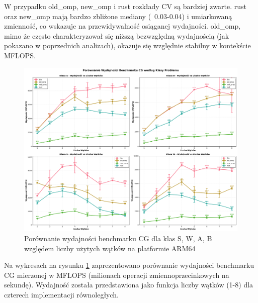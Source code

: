 W przypadku old\_omp, new\_omp i rust rozkłady CV są bardziej zwarte. rust oraz new\_omp mają bardzo zbliżone mediany (~0.03-0.04) i umiarkowaną zmienność, co wskazuje na przewidywalność osiąganej wydajności. old\_omp, mimo że często charakteryzował się niższą bezwzględną wydajnością (jak pokazano w poprzednich analizach), okazuje się względnie stabilny w kontekście MFLOPS.

\begin{figure}[H]
    \centering
    \includegraphics[width=\textwidth]{analiza/images/parallel/cg/arm/cg_porownanie_wydajnosci.png}
    \caption{Porównanie wydajności benchmarku CG dla klas S, W, A, B względem liczby użytych wątków na platformie ARM64}
    \label{cg_porownanie_wydajnosci}
\end{figure}
Na wykresach na rysunku \ref{cg_porownanie_wydajnosci} zaprezentowano porównanie wydajności benchmarku CG mierzonej w MFLOPS (milionach operacji zmiennoprzecinkowych na sekundę). Wydajność została przedstawiona jako funkcja liczby wątków (1-8) dla czterech implementacji równoległych.

